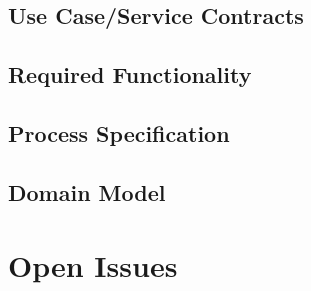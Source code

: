 \documentclass[12pt]{article}
\begin{document}
\subsection{Use Case/Service Contracts}

\subsection{Required Functionality}

\subsection{Process Specification}

\subsection{Domain Model}


\section{Open Issues}
\end{document}
